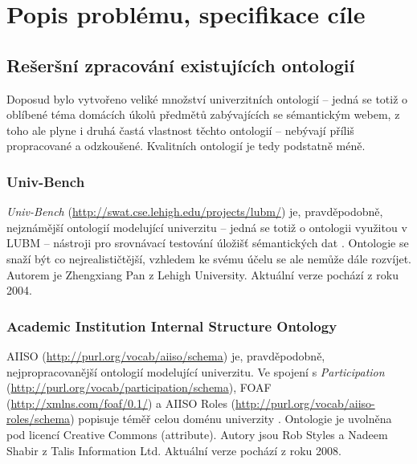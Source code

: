 \chapter{Popis problému, specifikace cíle}
% 
% 

\section{Rešeršní zpracování existujících ontologií}
Doposud bylo vytvořeno veliké množství univerzitních ontologií -- jedná se totiž o oblíbené téma domácích úkolů předmětů zabývajících se sémantickým webem, z toho ale plyne i druhá častá vlastnost těchto ontologií -- nebývají příliš propracované a odzkoušené. Kvalitních ontologií je tedy podstatně méně.

\subsection{Univ-Bench}
\emph{Univ-Bench} (\url{http://swat.cse.lehigh.edu/projects/lubm/}) je, pravděpodobně, nejznámější ontologií modelující univerzitu -- jedná se totiž o ontologii využitou v \gls{LUBM} -- nástroji pro srovnávací testování úložišť sémantických dat \cite{Lubm}. Ontologie se snaží být co nejrealističtější, vzhledem ke svému účelu se ale nemůže dále rozvíjet. Autorem je Zhengxiang Pan z Lehigh University. Aktuální verze pochází z roku 2004.

\subsection{Academic Institution Internal Structure Ontology}
\Gls{AIISO} (\url{http://purl.org/vocab/aiiso/schema}) je, pravděpodobně, nejpropracovanější ontologií modelující univerzitu. Ve spojení s \emph{Participation} (\url{http://purl.org/vocab/participation/schema}), \gls{FOAF} (\url{http://xmlns.com/foaf/0.1/}) a \gls{AIISO} Roles (\url{http://purl.org/vocab/aiiso-roles/schema}) popisuje téměř celou doménu univerzity \cite{Aiiso}. Ontologie je uvolněna pod licencí Creative Commons (attribute). Autory jsou Rob Styles a Nadeem Shabir z Talis Information Ltd. Aktuální verze pochází z roku 2008.

